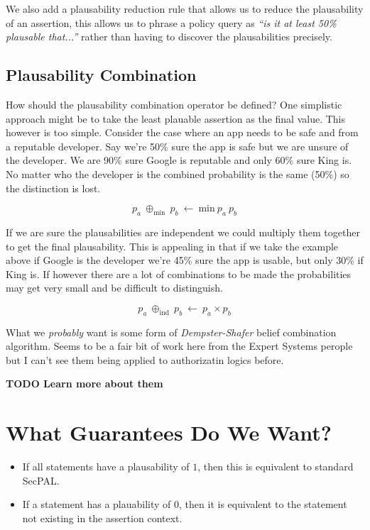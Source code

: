 \documentclass[a4paper]{article}
\begin{document}
We also add a plausability reduction rule that allows us to reduce the plausability of an assertion, this allows us to phrase a policy query as \emph{``is it at least 50\% plausable that...''} rather than having to discover the plausabilities precisely.

\subsection{Plausability Combination}

How should the plausability combination operator be defined?
One simplistic approach might be to take the least plauable assertion as the final value.
This however is too simple. Consider the case where an app needs to be safe and from a reputable developer.  Say we're 50\% sure the app is safe but we are unsure of the developer. We are 90\% sure Google is reputable and only 60\% sure King is.  No matter who the developer is the combined probability is the same (50\%) so the distinction is lost.

\begin{equation}
  p_a~\oplus_{\text{min}}~p_b~\gets~\text{min}~p_a~p_b
\end{equation}

If we are sure the plausabilities are independent we could multiply them together to get the final plausability. This is appealing in that if we take the example above if Google is the developer we're 45\% sure the app is usable, but only 30\% if King is.  If however there are a lot of combinations to be made the probabilities may get very small and be difficult to distinguish.

\begin{equation}
  p_a~\oplus_{\text{ind}}~p_b~\gets~p_a\times p_b
\end{equation}

What we \emph{probably} want is some form of \emph{Dempster-Shafer} belief combination algorithm.  Seems to be a fair bit of work here from the Expert Systems perople but I can't see them being applied to authorizatin logics before.

\textbf{TODO Learn more about them}

\section{What Guarantees Do We Want?} 

\begin{itemize}
\item If all statements have a plausability of $1$, then this is equivalent to standard SecPAL.
\item If a statement has a plauability of $0$, then it is equivalent to the statement not existing in the assertion context.
\end{itemize}
\end{document}

